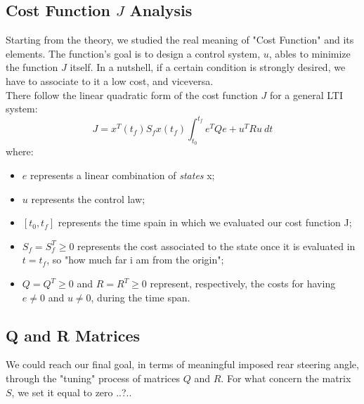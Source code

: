 \documentclass[a4paper,12pt,titlepage]{report}
\numberwithin{figure}{section}
\begin{document}
\subsection{Cost Function $J$ Analysis}
Starting from the theory, we studied the real meaning of "Cost Function" and its elements. The function's goal is to design a control system, $u$, ables to minimize the function $J$ itself. In a nutshell, if a certain condition is strongly desired, we have to associate to it a low cost, and viceversa. \\
There follow the linear quadratic form of the cost function $J$ for a general LTI system:
\begin{equation}
J = x^{T}(t_{f}) S_{f} x(t_{f})\int_{t_{0}}^{t_{f}} e^{T} Q e + u^{T} R u \ dt
\end{equation}
where:
\begin{itemize}
	\item $e$ represents a linear combination of \textit{states} x;
	\item $u$ represents the control law;
	\item $ [t_{0},t_{f}] $ represents the time spain in which we evaluated our cost function J;
	\item $ S_{f} = S_{f}^{T} \geq0 $ represents the cost associated to the state once it is evaluated in $t=t_{f}$, so "how much far i am from the origin";
	\item $ Q=Q^{T}\geq 0 $ and $ R=R^{T}\geq 0 $ represent, respectively, the costs for having $e\neq0$ and $u\neq0$, during the time span.
\end{itemize}
\subsection{Q and R Matrices}
We could reach our final goal, in terms of meaningful imposed rear steering angle, through the "tuning" process of matrices $Q$ and $R$. For what concern the matrix $S$, we set it equal to zero ..?..	
\end{document}
